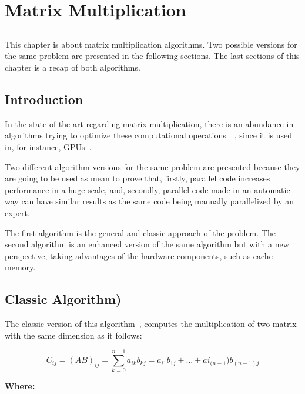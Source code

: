 \chapter{Matrix Multiplication} \label{chap:sota2}

\section*{}
  
This chapter is about matrix multiplication algorithms. Two possible versions for the same problem are presented in the following sections. The last sections of this chapter is a recap of both algorithms. 

\section{Introduction}

In the state of the art regarding matrix multiplication, there is an abundance in algorithms trying to optimize these computational operations~\cite{Goto2008}~\cite{Yuster2005}, since it is used in, for instance, GPUs~\cite{Fatahalian2004}.
 
Two different algorithm versions for the same problem are presented because they are going to be used as mean to prove that, firstly, parallel code increases performance in a huge scale, and, secondly, parallel code made in an automatic way can have similar results as the same code being manually parallelized by an expert.

The first algorithm is the general and classic approach of the problem. The second algorithm is an enhanced version of the same algorithm but with a new perspective, taking advantages of the hardware components, such as cache memory.

\section{Classic Algorithm)}\label{sec:dialecto}


The classic version of this algorithm~\cite{Fatahalian2004}, computes the multiplication of two matrix with the same dimension as it follows:

\begin{equation}
C_{ij} = (AB)_{ij} = \sum_{k=0}^{n-1} a_{ik} b_{kj} = a_{i1} b_{1j} + ... + ai_{(n-1})b_{(n-1)j}
\end{equation}

\textbf{Where:}

